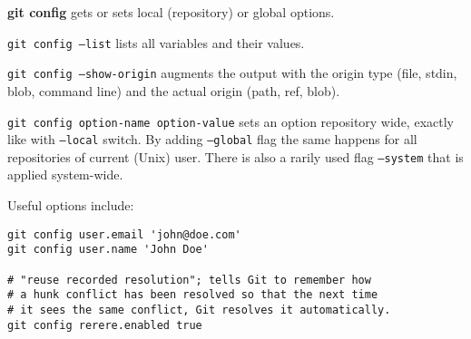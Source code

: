 %

\textbf{git config} gets or sets local (repository) or global options.

\texttt{git config --list} lists all variables and their values.

\texttt{git config --show-origin} augments the output with the origin type (file, stdin, blob, command line) and the actual origin (path, ref, blob).

\texttt{git config option-name option-value} sets an option repository wide, exactly like with \texttt{--local} switch.
By adding \texttt{--global} flag the same happens for all repositories of current (Unix) user.
There is also a rarily used flag \texttt{--system} that is applied system-wide.

Useful options include:
\begin{verbatim}
git config user.email 'john@doe.com'
git config user.name 'John Doe'

# "reuse recorded resolution"; tells Git to remember how
# a hunk conflict has been resolved so that the next time
# it sees the same conflict, Git resolves it automatically.
git config rerere.enabled true
\end{verbatim}

%